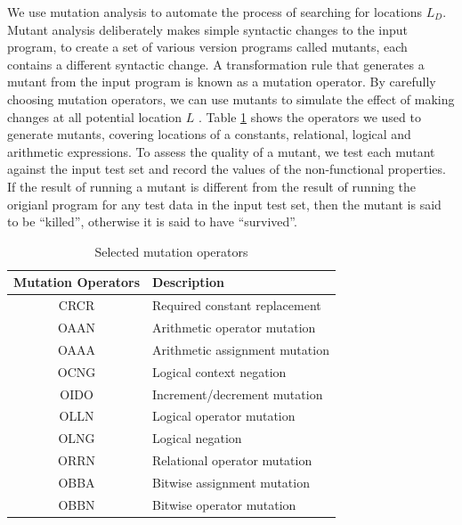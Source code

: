 We use mutation analysis to automate the process of searching for locations $L_D$. Mutant analysis deliberately makes simple syntactic changes to the input program, to create a set of various version programs called mutants, each contains a different syntactic change. A transformation rule that generates a mutant from the input program is known as a mutation operator. By carefully choosing mutation operators, we can use mutants to simulate the effect of making changes at all potential location $L$ . Table \ref{tab:cmop} shows the operators we used to generate mutants, covering locations of a constants, relational, logical and arithmetic expressions. 
To assess the quality of a mutant, we test each mutant against the input test set and record the values of the non-functional properties. If the result of running a mutant is different from the result of running the origianl program for any test data in the input test set, then the mutant is said to be ``killed'', otherwise it is said to have ``survived''. 

\begin{table} [htbp]
\caption{Selected mutation operators}
\label{tab:cmop} 
\begin{center}
\begin{tabular}{ | c | l |}
  \hline
  Mutation Operators & Description \\ 
\hline
  CRCR & Required constant replacement \\
  OAAN & Arithmetic operator mutation \\
  OAAA & Arithmetic assignment mutation \\
  OCNG & Logical context negation \\
  OIDO & Increment/decrement mutation  \\
  OLLN & Logical operator mutation  \\ 
  OLNG & Logical negation \\
  ORRN & Relational operator mutation \\
  OBBA & Bitwise assignment mutation \\
  OBBN & Bitwise operator mutation \\
\hline
\end{tabular} 
\end{center} 
\end{table} 

